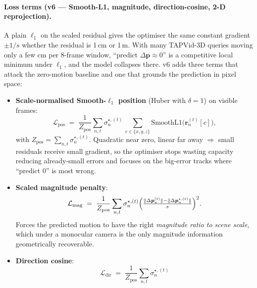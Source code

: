 \documentclass[11pt,a4paper]{article}
\begin{document}
\paragraph{Loss terms (v6 — Smooth-L1, magnitude, direction-cosine, 2-D reprojection).}
A plain $\ell_1$ on the scaled residual gives the optimiser the same
constant gradient $\pm 1/s$ whether the residual is 1\,cm or 1\,m. With
many TAPVid-3D queries moving only a few cm per 8-frame window,
``predict $\Delta\bm{p} \!\approx\! 0$'' is a competitive local minimum
under $\ell_1$, and the model collapses there. v6 adds three terms that
attack the zero-motion baseline and one that grounds the prediction in
pixel space:
\begin{itemize}
  \item \textbf{Scale-normalised Smooth-$\ell_1$ position} (Huber with
        $\delta\!=\!1$) on visible frames:
        \begin{equation}\label{eq:track-pos-loss}
          \mathcal{L}_{\text{pos}}
            \;=\;
            \frac{1}{Z_{\text{pos}}}\sum_{n,t}
              \sigma_n^{\star,(t)}\,
              \sum_{c\in\{x,y,z\}}
              \mathrm{SmoothL1}\!\bigl(\bm{r}_n^{(t)}[c]\bigr),
        \end{equation}
        with $Z_{\text{pos}} = \sum_{n,t}\sigma_n^{\star,(t)}$. Quadratic
        near zero, linear far away $\Rightarrow$ small residuals receive
        small gradient, so the optimiser stops wasting capacity reducing
        already-small errors and focuses on the big-error tracks where
        ``predict $0$'' is most wrong.
  \item \textbf{Scaled magnitude penalty}:
        \begin{equation}\label{eq:track-mag-loss}
          \mathcal{L}_{\text{mag}}
            \;=\;
            \frac{1}{Z_{\text{pos}}}\sum_{n,t}
              \sigma_n^{\star,(t)}
              \Bigl(\tfrac{\|\Delta\bm{p}_n^{(t)}\| -
                            \|\Delta\bm{p}_n^{\star,(t)}\|}{s}\Bigr)^{2}.
        \end{equation}
        Forces the predicted motion to have the right \emph{magnitude
        ratio to scene scale}, which under a monocular camera is the
        only magnitude information geometrically recoverable.
  \item \textbf{Direction cosine}:
        \begin{equation}\label{eq:track-dir-loss}
          \mathcal{L}_{\text{dir}}
            \;=\;
            \frac{1}{Z_{\text{pos}}}\sum_{n,t}
              \sigma_n^{\star,(t)}

\end{equation}
\end{itemize}
\end{document}
